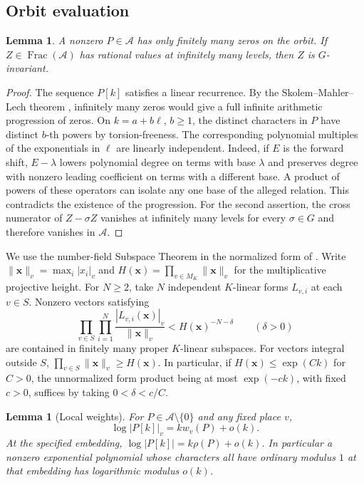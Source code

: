 \documentclass[11pt,a4paper,reqno]{amsart}
\newtheorem{lemma}[theorem]{Lemma}
\theoremstyle{definition}
\theoremstyle{remark}
\numberwithin{equation}{section}
\begin{document}
\subsection{Orbit evaluation}

\begin{lemma}\label{lem:alg-orbit}
A nonzero \(P\in\mathcal A\) has only finitely many zeros on the
orbit. If \(Z\in\operatorname{Frac}(\mathcal A)\) has rational values
at infinitely many levels, then \(Z\) is \(G\)-invariant.
\end{lemma}

\begin{proof}
The sequence \(P[k]\) satisfies a linear recurrence. By the
Skolem--Mahler--Lech theorem \cite{LechSML}, infinitely many zeros
would give a full infinite arithmetic progression of zeros. On
\(k=a+b\ell\), \(b\ge1\), the distinct characters in \(P\) have
distinct \(b\)-th powers by torsion-freeness. The corresponding
polynomial multiples of the exponentials in \(\ell\) are linearly
independent. Indeed, if \(E\) is the forward shift, \(E-\lambda\)
lowers polynomial degree on terms with base \(\lambda\) and
preserves degree with nonzero leading coefficient on terms with a
different base. A product of powers of these operators can isolate
any one base of the alleged relation. This contradicts the existence
of the progression. For the second assertion, the cross numerator
of \(Z-\sigma Z\) vanishes at infinitely many levels for every
\(\sigma\in G\) and therefore vanishes in \(\mathcal A\).
\end{proof}

We use the number-field Subspace Theorem \cite{Schlickewei} in
the normalized form of \cite[proof of Lemma~1]{CZ04}. Write
\(\|\mathbf x\|_v=\max_i|x_i|_v\) and
\(H(\mathbf x)=\prod_{v\in M_K}\|\mathbf x\|_v\) for the
multiplicative projective height. For \(N\ge2\), take \(N\) independent
\(K\)-linear forms \(L_{v,i}\) at each \(v\in S\). Nonzero vectors
satisfying
\[
 \prod_{v\in S}\prod_{i=1}^{N}
     \frac{|L_{v,i}(\mathbf x)|_v}{\|\mathbf x\|_v}
     < H(\mathbf x)^{-N-\delta}
 \qquad(\delta>0)
\]
are contained in finitely many proper \(K\)-linear subspaces.
For vectors integral outside \(S\),
\(\prod_{v\in S}\|\mathbf x\|_v\ge H(\mathbf x)\). In particular,
if \(H(\mathbf x)\le \exp(Ck)\) for \(C>0\), the unnormalized form
product being at most \(\exp(-ck)\), with fixed \(c>0\), suffices
by taking \(0<\delta<c/C\).

\begin{lemma}[Local weights]\label{lem:localweight}
For \(P\in\mathcal A\setminus\{0\}\) and any fixed place \(v\),
\begin{equation}\label{eq:alg-localweight}
 \log |P[k]|_v=k w_v(P)+o(k).
\end{equation}
At the specified embedding,
\(\log|P[k]|=k\rho(P)+o(k)\). In particular a nonzero exponential
polynomial whose characters all have ordinary modulus \(1\) at that
embedding has logarithmic modulus \(o(k)\).
\end{lemma}
\end{document}
